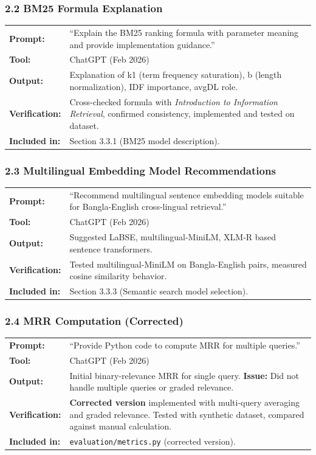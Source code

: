 \documentclass[12pt,a4paper]{article}
\begin{document}
\subsubsection*{2.2 BM25 Formula Explanation}
\begin{tabular}{p{3.2cm}p{9.5cm}}
\textbf{Prompt:}        & ``Explain the BM25 ranking formula with parameter meaning and provide implementation guidance.'' \\
\textbf{Tool:}          & ChatGPT (Feb 2026) \\
\textbf{Output:}        & Explanation of k1 (term frequency saturation), b (length normalization), IDF importance, avgDL role. \\
\textbf{Verification:}  & Cross-checked formula with \textit{Introduction to Information Retrieval}, confirmed consistency, implemented and tested on dataset. \\
\textbf{Included in:}   & Section 3.3.1 (BM25 model description). \\
\end{tabular}

\subsubsection*{2.3 Multilingual Embedding Model Recommendations}
\begin{tabular}{p{3.2cm}p{9.5cm}}
\textbf{Prompt:}        & ``Recommend multilingual sentence embedding models suitable for Bangla-English cross-lingual retrieval.'' \\
\textbf{Tool:}          & ChatGPT (Feb 2026) \\
\textbf{Output:}        & Suggested LaBSE, multilingual-MiniLM, XLM-R based sentence transformers. \\
\textbf{Verification:}  & Tested multilingual-MiniLM on Bangla-English pairs, measured cosine similarity behavior. \\
\textbf{Included in:}   & Section 3.3.3 (Semantic search model selection). \\
\end{tabular}

\subsubsection*{2.4 MRR Computation (Corrected)}
\begin{tabular}{p{3.2cm}p{9.5cm}}
\textbf{Prompt:}        & ``Provide Python code to compute MRR for multiple queries.'' \\
\textbf{Tool:}          & ChatGPT (Feb 2026) \\
\textbf{Output:}        & Initial binary-relevance MRR for single query. \textbf{Issue:} Did not handle multiple queries or graded relevance. \\
\textbf{Verification:}  & \textbf{Corrected version} implemented with multi-query averaging and graded relevance. Tested with synthetic dataset, compared against manual calculation. \\
\textbf{Included in:}   & \texttt{evaluation/metrics.py} (corrected version). \\
\end{tabular}
\end{document}
